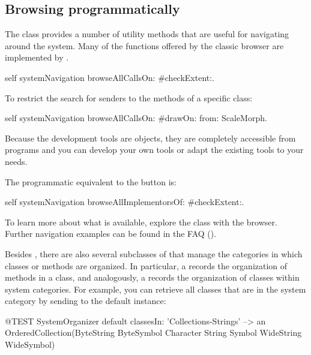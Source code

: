 \documentclass[a4paper,10pt,twoside]{book}
\begin{document}

\subsection{Browsing programmatically}

The class  provides a number of utility methods that are useful for navigating around the system.
Many of the functions offered by the classic browser are implemented by .

\begin{code}{}
self systemNavigation browseAllCallsOn: #checkExtent:.
\end{code}
To restrict the search for senders to the methods of a specific class:
\begin{code}{}
self systemNavigation browseAllCallsOn: #drawOn: from: ScaleMorph.
\end{code}
Because the development tools are objects, they are completely accessible from programs and you can develop your own tools or adapt the existing tools to your needs.

The programmatic equivalent to the  button is:
\begin{code}{}
self systemNavigation browseAllImplementorsOf: #checkExtent:.
\end{code}

To learn more about what is available, explore the class  with the browser.
Further navigation examples can be found in the FAQ ().

Besides , there are also several subclasses of  that manage the categories in which classes or methods are organized.
In particular, a  records the organization of methods in a class, and analogously, a  records the organization of classes within system categories.
For example, you can retrieve all classes that are in the system category  by sending  to the default  instance:
\begin{code}{@TEST}
SystemOrganizer default classesIn: 'Collections-Strings' --> an OrderedCollection(ByteString ByteSymbol Character String Symbol WideString WideSymbol)
\end{code}
\end{document}
